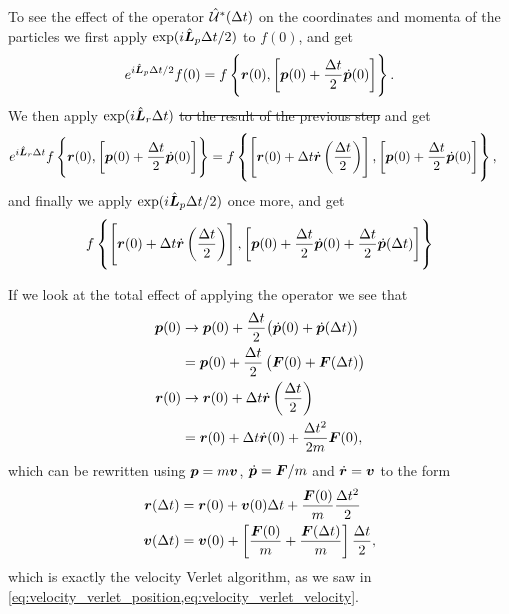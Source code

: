 To see the effect of the operator $\hat{\mathcal{U}}^*(\Delta t)$ on the coordinates and momenta of the particles we first apply $\exp(i\hat{\boldsymbol{L}}_p\Delta t/2)$ to $f(0)$, and get
\begin{align*}
    e^{i\hat{\boldsymbol{L}}_p \Delta t/2} f(0) = f \left\{ \boldsymbol{r}(0), \left[ \boldsymbol{p}(0) + \frac{\Delta t}{2} \dot{\boldsymbol{p}}(0) \right] \right\}.
\end{align*}
We then apply $\exp(i\hat{\boldsymbol{L}}_r\Delta t)$ \st{to the result of the previous step} and get
\begin{align*}
     e^{i\hat{\boldsymbol{L}}_r \Delta t} f \left\{ \boldsymbol{r}(0), \left[ \boldsymbol{p}(0) + \frac{\Delta t}{2}\dot{\boldsymbol{p}}(0) \right] \right\}
     &= f \left\{ \left[ \boldsymbol{r}(0) + \Delta t \dot{\boldsymbol{r}}\left(\frac{\Delta t}{2}\right) \right], \left[ \boldsymbol{p}(0) + \frac{\Delta t}{2}\dot{\boldsymbol{p}}(0) \right] \right\},
\end{align*}
and finally we apply $\exp(i\hat{\boldsymbol{L}}_p\Delta t/2)$ once more, and get
\begin{align*}
    f \left\{ 
        \left[ \boldsymbol{r}(0) + \Delta t \dot{\boldsymbol{r}}\left(\frac{\Delta t}{2}\right) \right], 
        \left[ \boldsymbol{p}(0) + \frac{\Delta t}{2}\dot{\boldsymbol{p}}(0) + \frac{\Delta t}{2}\dot{\boldsymbol{p}}(\Delta t) \right] 
    \right\}
\end{align*}


If we look at the total effect of applying the operator we see that
\begin{align*}
    \boldsymbol{p}(0) 
    &\rightarrow \boldsymbol{p}(0) + \frac{\Delta t}{2} \big(\dot{\boldsymbol{p}}(0) + \dot{\boldsymbol{p}}(\Delta t) \big) \\
    &= \boldsymbol{p}(0) + \frac{\Delta t}{2} \left( \boldsymbol{F}(0) + \boldsymbol{F}(\Delta t) \right) \\
    \boldsymbol{r}(0)
    &\rightarrow \boldsymbol{r}(0) + \Delta t \dot{\boldsymbol{r}}\left(\frac{\Delta t}{2}\right) \\
    &= \boldsymbol{r}(0) + \Delta t \dot {\boldsymbol{r}}(0) + \frac{\Delta t^2}{2m}\boldsymbol{F}(0),
\end{align*}
which can be rewritten using $\boldsymbol{p} = m\boldsymbol{v}$, $\dot {\boldsymbol{p}} = \boldsymbol{F}/m$ and $\dot {\boldsymbol{r}} = \boldsymbol{v}$ to the form
\begin{align*}
    \boldsymbol{r}(\Delta t) &= \boldsymbol{r}(0) + \boldsymbol{v}(0)\Delta t + \frac{\boldsymbol{F}(0)}{m}\frac{\Delta t^2}{2} \\
    \boldsymbol{v}(\Delta t) &= \boldsymbol{v}(0) + \left[\frac{\boldsymbol{F}(0)}{m} + \frac{\boldsymbol{F}(\Delta t)}{m}\right] \frac{\Delta t}{2},
\end{align*}
which is exactly the velocity Verlet algorithm, as we saw in \cref{eq:velocity_verlet_position,eq:velocity_verlet_velocity}.

